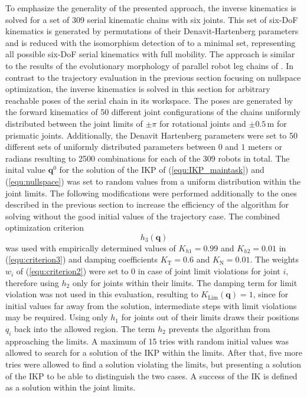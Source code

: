 \documentclass[robotics,article,submit,moreauthors,pdftex]{Definitions/mdpi}
\newcommand{\bm}[1]{\boldsymbol{#1}}
\begin{document}
To emphasize the generality of the presented approach, the inverse kinematics is solved for a set of 309 serial kinematic chains with six joints.
This set of six-DoF kinematics is generated by permutations of their Denavit-Hartenberg parameters and is reduced with the isomorphism detection of \cite{RamirezKotOrt2015} to a minimal set, representing all possible six-DoF serial kinematics with full mobility.
The approach is similar to the results of the evolutionary morphology of parallel robot leg chains of \cite{Gogu2008}.
In contrast to the trajectory evaluation in the previous section focusing on nullspace optimization, the inverse kinematics is solved in this section for arbitrary reachable poses of the serial chain in its workspace.
The poses are generated by the forward kinematics of 50 different joint configurations of the chains uniformly distributed between the joint limits of $\pm \pi$ for rotational joints and $\pm0.5\,\mathrm{m}$ for prismatic joints.
Additionally, the Denavit Hartenberg parameters were set to 50 different sets of uniformly distributed parameters between $0$ and $1$ meters or radians resulting to 2500 combinations for each of the 309 robots in total.
The inital value $\bm{q}^0$ for the solution of the IKP of (\ref{equ:IKP_maintask}) and
(\ref{equ:nullspace}) was set to random values from a uniform distribution within the joint limits.
The following modifications were performed additionally to the ones described in the previous section to increase the efficiency of the algorithm for solving without the good initial values of the trajectory case.
The combined optimization criterion
%
\begin{equation}
h_3(\bm{q})
\end{equation}
%
was used with empirically determined values of $K_{h1}=0.99$ and $K_{h2}=0.01$ in (\ref{equ:criterion3}) and damping coefficients $K_{\mathrm{T}}=0.6$ and $K_{\mathrm{N}}=0.01$.
The weights $w_i$ of (\ref{equ:criterion2}) were set to 0 in case of joint limit violations for joint $i$, therefore using $h_2$ only for joints within their limits.
The damping term for limit violation was not used in this evaluation, resulting to $K_\mathrm{Lim}(\bm{q})=1$, since for initial values far away from the solution, intermediate steps with limit violations may be required.
Using only $h_1$ for joints out of their limits draws their positions $q_i$ back into the allowed region.
The term $h_2$ prevents the algorithm from approaching the limits.
%
A maximum of 15 tries with random initial values was allowed to search for a solution of the IKP within the limits.
After that, five more tries were allowed to find a solution violating the limits, but presenting a solution of the IKP to be able to distinguish the two cases.
A success of the IK is defined as a solution within the joint limits.
\end{document}
